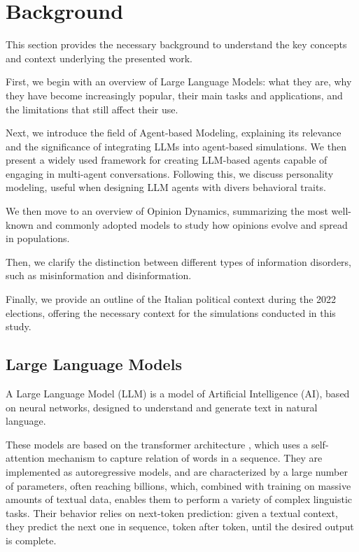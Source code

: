 \section{Background}
\label{sec:background}

This section provides the necessary background to understand the key concepts and context underlying the presented work.

First, we begin with an overview of Large Language Models: what they are, why they have become increasingly popular, their main tasks and applications, and the limitations that still affect their use.

Next, we introduce the field of Agent-based Modeling, explaining its relevance and the significance of integrating LLMs into agent-based simulations. We then present a widely used framework for creating LLM-based agents capable of engaging in multi-agent conversations. 
Following this, we discuss personality modeling, useful when designing LLM agents with divers behavioral traits.

We then move to an overview of Opinion Dynamics, summarizing the most well-known and commonly adopted models to study how opinions evolve and spread in populations.

Then, we clarify the distinction between different types of information disorders, such as misinformation and disinformation.

Finally, we provide an outline of the Italian political context during the 2022 elections, offering the necessary context for the simulations conducted in this study.


\subsection{Large Language Models}
A Large Language Model (LLM) is a model of Artificial Intelligence (AI), based on neural networks, designed to understand and generate text in natural language.

These models are based on the transformer architecture \cite{vaswani2023attentionneed}, which uses a self-attention mechanism to capture relation of words in a sequence.
They are implemented as autoregressive models, and are characterized by a large number of parameters, often reaching billions, which, combined with training on massive amounts of textual data, enables them to perform a variety of complex linguistic tasks.
Their behavior relies on next-token prediction: given a textual context, they predict the next one in sequence, token after token, until the desired output is complete.

